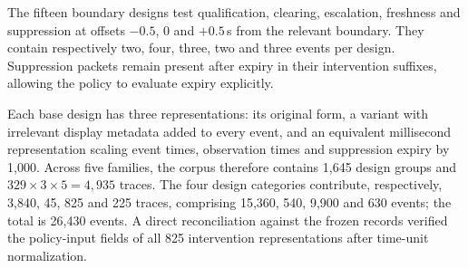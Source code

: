 The fifteen boundary designs test qualification, clearing, escalation, freshness and suppression at offsets $-0.5$, $0$ and $+0.5$\,s from the relevant boundary. They contain respectively two, four, three, two and three events per design. Suppression packets remain present after expiry in their intervention suffixes, allowing the policy to evaluate expiry explicitly.

Each base design has three representations: its original form, a variant with irrelevant display metadata added to every event, and an equivalent millisecond representation scaling event times, observation times and suppression expiry by 1,000. Across five families, the corpus therefore contains 1,645 design groups and $329\times3\times5=4,935$ traces. The four design categories contribute, respectively, 3,840, 45, 825 and 225 traces, comprising 15,360, 540, 9,900 and 630 events; the total is 26,430 events. A direct reconciliation against the frozen records verified the policy-input fields of all 825 intervention representations after time-unit normalization.
